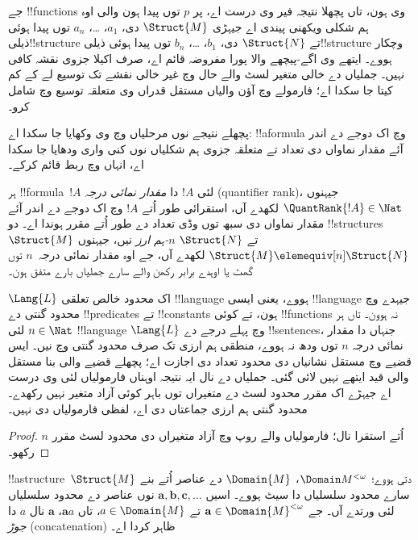 \documentclass[../../../include/open-logic-section]{subfiles}
\begin{document}
\begin{rem}
جے !!{function}s وی ہون، تاں پچھلا نتیجہ فیر وی درست اے، پر
$p$ توں پیدا ہون والی اوہ ہم شکلی ویکھنی پیندی اے جیہڑی
$\Struct{M}$ دی، $a_1$، \dots، $a_n$ توں پیدا ہوئی
ذیلی!!{structure} تے $\Struct{N}$ دی، $b_1$، \dots، $b_n$
توں پیدا ہوئی ذیلی!!{structure} وچکار ہووے۔
ایتھے وی اگے-پیچھے والا پورا مفروضہ قائم اے، صرف اکیلا جزوی نقشہ کافی نہیں۔
جملیاں دے خالی متغیر لسٹ والے حال وچ غیر خالی نقشے تک توسیع لے کے کم کیتا
جا سکدا اے؛ فارمولے وچ آؤن والیاں مستقل قدراں وی متعلقہ توسیع وچ شامل کرو۔
\end{rem}

پچھلے نتیجے نوں مرحلیاں وچ وی وکھایا جا سکدا اے: !!a{formula}
وچ اک دوجے دے اندر آئے مقدار نماواں دی تعداد تے متعلقہ جزوی
ہم شکلیاں نوں کنی واری ودھایا جا سکدا اے، انہاں وچ ربط قائم کرکے۔

\begin{defn}
  ہر !!{formula}~$!A$ لئی $!A$ دا \emph{مقدار نمائی درجہ}
  (quantifier rank)، جیہنوں $\QuantRank{!A} \in \Nat$ لکھدے آں،
  استقرائی طور اُتے $!A$ وچ اک دوجے دے اندر آئے مقدار نماواں دی
  سبھ توں وڈی تعداد دے طور اُتے مقرر ہوندا اے۔ دو
  !!{structure}s $\Struct{M}$ تے $\Struct{N}$ \emph{$n$-ہم ارز}
  نیں، جیہنوں $\Struct{M} \elemequiv[n] \Struct{N}$ لکھدے آں،
  جے اوہ مقدار نمائی درجہ~$n$ توں گھٹ یا اوہدے برابر رکھن والے
  سارے جملیاں بارے متفق ہون۔
\end{defn}

\begin{prop}
  $\Lang{L}$ اک محدود خالص تعلقی !!{language} ہووے، یعنی ایسی
  !!{language} جیہدے وچ محدود گنتی دے !!{predicate}s تے
  !!{constant}s ہون، تے کوئی !!{function}s نہ ہوون۔ تاں ہر
  $n \in \Nat$ لئی !!{language} $\Lang{L}$ وچ پہلے درجے دے
  !!{sentence}s، جنہاں دا مقدار نمائی درجہ $n$ توں ودھ نہ ہووے،
  منطقی ہم ارزی تک صرف محدود گنتی وچ نیں۔
  ایس قضیے وچ مستقل نشانیاں دی محدود تعداد دی اجازت اے؛ پچھلے قضیے والی
  بنا مستقل والی قید ایتھے نہیں لائی گئی۔ جملیاں دے نال ایہ نتیجہ اوہناں
  فارمولیاں لئی وی درست اے جیہڑے اک مقرر محدود لسٹ دے متغیراں توں باہر
  کوئی آزاد متغیر نہیں رکھدے۔ محدود گنتی ہم ارزی جماعتاں دی اے، لفظی فارمولیاں دی نہیں۔
\end{prop}

\begin{proof}
  $n$ اُتے استقرا نال؛ فارمولیاں والے روپ وچ آزاد متغیراں دی محدود لسٹ مقرر رکھو۔
\end{proof}

\begin{defn}
  !!a{structure}~$\Struct{M}$ دتی ہووے؛ $\Domain M^{<\omega}$،
  $\Domain{M}$ دے عناصر اُتے بنے سارے محدود سلسلیاں دا سیٹ ہووے۔
  اسیں $\mathbf{a},
  \mathbf{b}, \mathbf{c}, \ldots$ نوں عناصر دے محدود سلسلیاں
  لئی ورتدے آں۔ جے $\mathbf{a} \in \Domain{M}^{<\omega}$ تے
  $a \in \Domain{M}$، تاں $\mathbf{a}a$، $\mathbf{a}$ نال
  $a$ دا \emph{جوڑ} (concatenation) ظاہر کردا اے۔
\end{defn}
\end{document}
